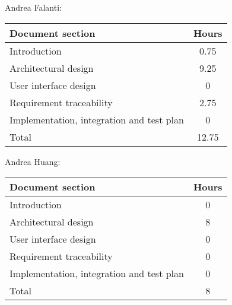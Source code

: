Andrea Falanti:

\begin{tabular}{|l|c|}
    \hline
    Document section & Hours \\
    \hline
     Introduction & 0.75\\
     Architectural design & 9.25\\
     User interface design & 0\\
     Requirement traceability & 2.75\\
     Implementation, integration and test plan & 0\\
     \hline
     Total & 12.75\\
     \hline
\end{tabular}
\vskip 0.3in

Andrea Huang:

\begin{tabular}{|l|c|}
    \hline
    Document section & Hours \\
    \hline
     Introduction & 0\\
     Architectural design & 8\\
     User interface design & 0\\
     Requirement traceability & 0\\
     Implementation, integration and test plan & 0\\
     \hline
     Total & 8\\
     \hline
\end{tabular}